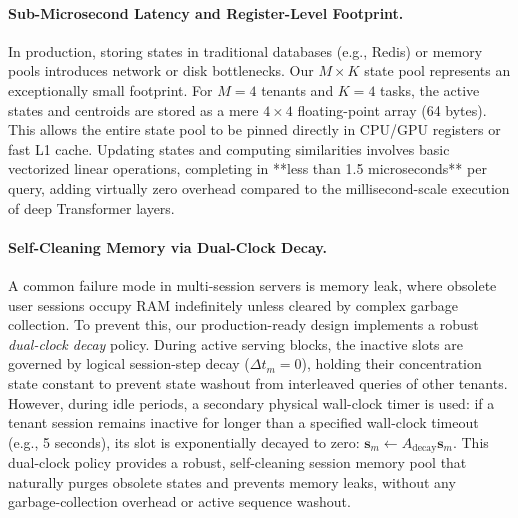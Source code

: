 \paragraph{Sub-Microsecond Latency and Register-Level Footprint.}
In production, storing states in traditional databases (e.g., Redis) or memory pools introduces network or disk bottlenecks. Our $M \times K$ state pool represents an exceptionally small footprint. For $M=4$ tenants and $K=4$ tasks, the active states and centroids are stored as a mere $4 \times 4$ floating-point array (64 bytes). This allows the entire state pool to be pinned directly in CPU/GPU registers or fast L1 cache. Updating states and computing similarities involves basic vectorized linear operations, completing in **less than 1.5 microseconds** per query, adding virtually zero overhead compared to the millisecond-scale execution of deep Transformer layers.

\paragraph{Self-Cleaning Memory via Dual-Clock Decay.}
A common failure mode in multi-session servers is memory leak, where obsolete user sessions occupy RAM indefinitely unless cleared by complex garbage collection. To prevent this, our production-ready design implements a robust \emph{dual-clock decay} policy. During active serving blocks, the inactive slots are governed by logical session-step decay ($\Delta t_m = 0$), holding their concentration state constant to prevent state washout from interleaved queries of other tenants. However, during idle periods, a secondary physical wall-clock timer is used: if a tenant session remains inactive for longer than a specified wall-clock timeout (e.g., 5 seconds), its slot is exponentially decayed to zero: $\mathbf{s}_{m} \leftarrow A_{\text{decay}} \mathbf{s}_{m}$. This dual-clock policy provides a robust, self-cleaning session memory pool that naturally purges obsolete states and prevents memory leaks, without any garbage-collection overhead or active sequence washout.
